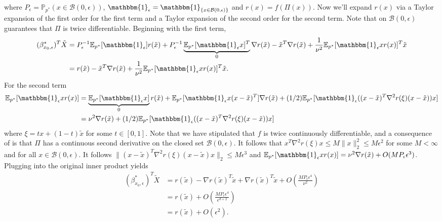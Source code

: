\documentclass[11pt]{article}
\begin{document}
where $P_{\epsilon} = \mathbb{P}_{p^*}(x \in \mathcal{B}(0, \epsilon))$, $\mathbbm{1}_\epsilon = \mathbbm{1}_{\{x \in \mathcal{B}(0, \epsilon)\}}$ and $r(x) = f(\Pi(x))$. Now we'll expand $r(x)$ via a Taylor expansion of the first order for the first term and a Taylor expansion of the second order for the second term. Note that on $\mathcal{B}(0, \epsilon)$  guarantees that $\Pi$ is twice differentiable. Beginning with the first term,
\begin{align*}
    (\beta^*_{x_0, \epsilon})^T \tilde X &= P_{\epsilon}^{-1}\mathbb{E}_{p^*}[\mathbbm{1}_{\epsilon}] r(\tilde x) + P_{\epsilon}^{-1}\underbrace{\mathbb{E}_{p^*}[\mathbbm{1}_{\epsilon}x]^T}_{0}\nabla r(\tilde x) - \tilde x^T\nabla r(\tilde x) +\frac{1}{\nu^2}\mathbb{E}_{p^*}[\mathbbm{1}_{\epsilon}xr(x)]^T \tilde x \\
    &= r(\tilde x) - \tilde x^T\nabla r(\tilde x) + \frac{1}{\nu^2}\mathbb{E}_{p^*}[\mathbbm{1}_{\epsilon}xr(x)]^T \tilde x.
\end{align*}
For the second term
\begin{align*}
    \mathbb{E}_{p^*}[\mathbbm{1}_{\epsilon}xr(x)] &= \underbrace{\mathbb{E}_{p^*}[\mathbbm{1}_{\epsilon}x]}_{0}r(\tilde x) + \mathbb{E}_{p^*}[\mathbbm{1}_{\epsilon}x(x -\tilde x)^T]\nabla r(\tilde{x}) + (1/2)\mathbb{E}_{p^*}[\mathbbm{1}_\epsilon((x-\tilde x)^T\nabla^2r(\xi)(x-\tilde x))x] \\
    &= \nu^2\nabla r(\tilde x) + (1/2)\mathbb{E}_{p^*}[\mathbbm{1}_\epsilon((x-\tilde x)^T\nabla^2r(\xi)(x-\tilde x))x]
\end{align*}
where $\xi = tx + (1-t)\tilde x$ for some $t \in [0,1]$. Note that we have stipulated that $f$ is twice continuously differentiable, and a consequence of  is that $\Pi$ has a continuous second derivative on the closed set $\mathcal{B}(0, \epsilon)$. It follows that $x^T\nabla^2r(\xi)x \leq M\|x\|_2^2 \leq M\epsilon^2$ for some $M < \infty$ and for all $x \in \mathcal{B}(0, \epsilon)$. It follows $\|(x-\tilde x)^T\nabla^2r(\xi)(x-\tilde x)x\|_2 \leq M\epsilon^3$ and $\mathbb{E}_{p^*}[\mathbbm{1}_{\epsilon}xr(x)] = \nu^2\nabla r(\tilde x) + O(MP_{\epsilon}\epsilon^3)$. Plugging into the original inner product yields
\begin{align*}
    (\beta^*_{x_0, \epsilon})^T \tilde X &= r(\tilde x) - \nabla r(\tilde x)^T \tilde x + \nabla r(\tilde x)^T \tilde x + O\left(\frac{MP_{\epsilon}\epsilon^4}{\nu^2}\right) \\
    &= r(\tilde x) + O\left(\frac{MP_{\epsilon}\epsilon^4}{\epsilon^{d+2}}\right) \\
    &= r(\tilde x) + O(\epsilon^2).
\end{align*}
\end{document}
